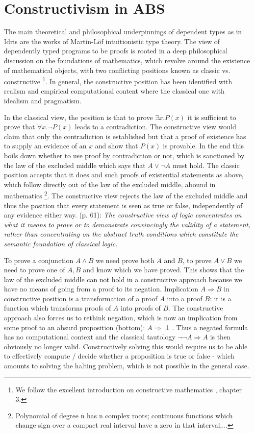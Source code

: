 \section{Constructivism in ABS}
\label{sub:dep_foundations}
The main theoretical and philosophical underpinnings of dependent types as in Idris are the works of Martin-L\"of intuitionistic type theory. The view of dependently typed programs to be proofs is rooted in a deep philosophical discussion on the foundations of mathematics, which revolve around the existence of mathematical objects, with two conflicting positions known as classic vs. constructive \footnote{We follow the excellent introduction on constructive mathematics \cite{thompson_type_1991}, chapter 3.}. In general, the constructive position has been identified with realism and empirical computational content where the classical one with idealism and pragmatism.

In the classical view, the position is that to prove $\exists x. P(x)$ it is sufficient to prove that $\forall x. \neg P(x)$ leads to a contradiction. The constructive view would claim that only the contradiction is established but that a proof of existence has to supply an evidence of an $x$ and show that $P(x)$ is provable. In the end this boils down whether to use proof by contradiction or not, which is sanctioned by the law of the excluded middle which says that $A \lor \neg A$ must hold. The classic position accepts that it does and such proofs of existential statements as above, which follow directly out of the law of the excluded middle, abound in mathematics \footnote{Polynomial of degree n has n complex roots; continuous functions which change sign over a compact real interval have a zero in that interval,...}. The constructive view rejects the law of the excluded middle and thus the position that every statement is seen as true or false, independently of any evidence either way. \cite{thompson_type_1991} (p. 61): \textit{The constructive view of logic concentrates on what it means to prove or to demonstrate convincingly the validity of a statement, rather than concentrating on the abstract truth conditions which constitute the semantic foundation of classical logic}.

To prove a conjunction $A \land B$ we need prove both $A$ and $B$, to prove $A \lor B$ we need to prove one of $A, B$ and know which we have proved. This shows that the law of the excluded middle can not hold in a constructive approach because we have no means of going from a proof to its negation. Implication $A \Rightarrow B$ in constructive position is a transformation of a proof $A$ into a proof $B$: it is a function which transforms proofs of $A$ into proofs of $B$. The constructive approach also forces us to rethink negation, which is now an implication from some proof to an absurd proposition (bottom): $A \Rightarrow \perp$. Thus a negated formula has no computational context and the classical tautology $\neg \neg A \Rightarrow A$ is then obviously no longer valid.  Constructively solving this would require us to be able to effectively compute / decide whether a proposition is true or false - which amounts to solving the halting problem, which is not possible in the general case.

